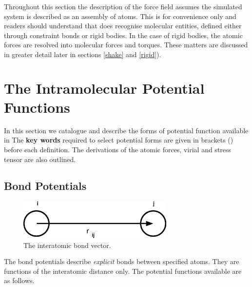 Throughout this section the description of the force field assumes the simulated system is described as an assembly of
atoms. This is for convenience only and readers should understand that
\D{} does recognise molecular entities, defined either through
constraint bonds or rigid bodies. In the case
of rigid bodies, the atomic forces are resolved into molecular forces
and torques. These matters are discussed in greater detail later in
sections \ref{shake} and \ref{rigid}).

\section{The Intramolecular Potential Functions}
\label{intramolecular}
In this section we catalogue and describe the forms of potential
function available in \D{}  The {\bf key words} required to select
potential forms are given in brackets () before each definition. The
derivations of the atomic forces, virial and stress tensor are also
outlined.

\subsection{Bond Potentials}

\begin{figure}[ht]
\begin{center}
\includegraphics[height=2cm]{bond.eps}
\caption{The interatomic bond vector.}
\end{center}
\end{figure}

The bond potentials describe {\em explicit} bonds between specified
atoms. They are functions of the interatomic distance only. The
potential functions available are as follows.

